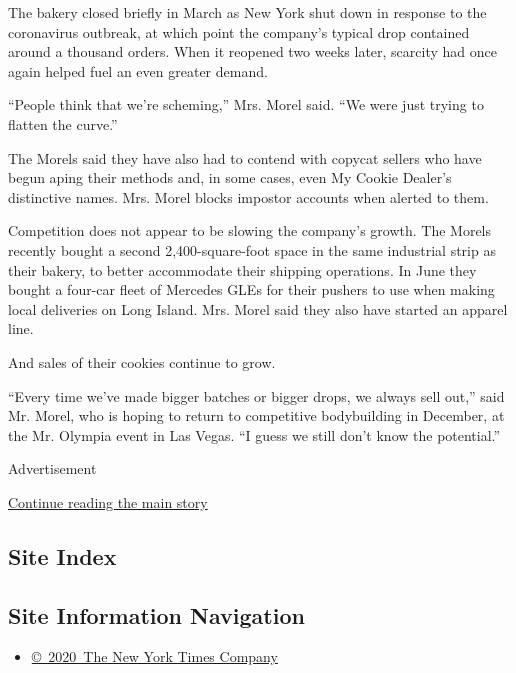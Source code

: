 The bakery closed briefly in March as New York shut down in response to
the coronavirus outbreak, at which point the company's typical drop
contained around a thousand orders. When it reopened two weeks later,
scarcity had once again helped fuel an even greater demand.

``People think that we're scheming,'' Mrs. Morel said. ``We were just
trying to flatten the curve.''

The Morels said they have also had to contend with copycat sellers who
have begun aping their methods and, in some cases, even My Cookie
Dealer's distinctive names. Mrs. Morel blocks impostor accounts when
alerted to them.

Competition does not appear to be slowing the company's growth. The
Morels recently bought a second 2,400-square-foot space in the same
industrial strip as their bakery, to better accommodate their shipping
operations. In June they bought a four-car fleet of Mercedes GLEs for
their pushers to use when making local deliveries on Long Island. Mrs.
Morel said they also have started an apparel line.

And sales of their cookies continue to grow.

``Every time we've made bigger batches or bigger drops, we always sell
out,'' said Mr. Morel, who is hoping to return to competitive
bodybuilding in December, at the Mr. Olympia event in Las Vegas. ``I
guess we still don't know the potential.''

Advertisement

\protect\hyperlink{after-bottom}{Continue reading the main story}

\hypertarget{site-index}{%
\subsection{Site Index}\label{site-index}}

\hypertarget{site-information-navigation}{%
\subsection{Site Information
Navigation}\label{site-information-navigation}}

\begin{itemize}
\tightlist
\item
  \href{https://help.nytimes3xbfgragh.onion/hc/en-us/articles/115014792127-Copyright-notice}{©~2020~The
  New York Times Company}
\end{itemize}

